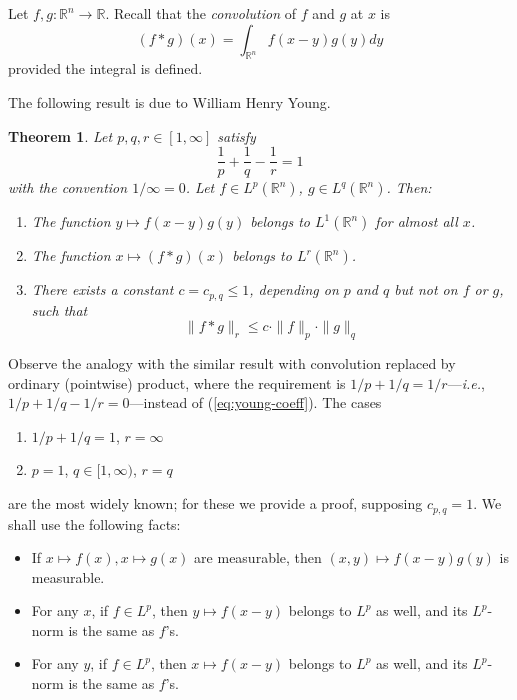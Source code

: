 \documentclass[12pt]{article}
\begin{document}
\newcommand{\ie}{\textit{i.e.}}
\newcommand{\Rset}{\ensuremath{\mathbb{R}}}

\newtheorem{theorem*}{Theorem}

Let $f,g:\Rset^n\to\Rset$.
Recall that the \emph{convolution} of $f$ and $g$ at $x$ is
\begin{displaymath}
(f\ast g)(x)=\int_{\Rset^n}f(x-y)g(y)dy
\end{displaymath}
provided the integral is defined.

The following result is due to William Henry Young.
\begin{theorem*}
Let $p,q,r\in[1,\infty]$ satisfy
\begin{equation} \label{eq:young-coeff}
\frac{1}{p}+\frac{1}{q}-\frac{1}{r}=1
\end{equation}
with the convention $1/\infty=0$.
Let $f\in L^p(\Rset^n)$, $g\in L^q(\Rset^n)$.
Then:
\begin{enumerate}
\item \label{it:L1}
The function $y\mapsto f(x-y)g(y)$
belongs to $L^1(\Rset^n)$ for almost all $x$.
\item \label{it:Lr}
The function $x\mapsto(f\ast g)(x)$
belongs to $L^r(\Rset^n)$.
\item \label{it:cpq}
There exists a constant $c=c_{p,q}\leq 1$,
depending on $p$ and $q$ but not on $f$ or $g$, such that
\begin{displaymath}
\|{f\ast g}\|_r
\leq c\cdot\|f\|_p\cdot\|g\|_q
\end{displaymath}
\end{enumerate}
\end{theorem*}
Observe the analogy with the similar result
with convolution replaced by ordinary (pointwise) product,
where the requirement is $1/p+1/q=1/r$---\ie,
$1/p+1/q-1/r=0$---instead of (\ref{eq:young-coeff}).
The cases
\begin{enumerate}
\item \label{item:p-q-infty}
$1/p+1/q=1$, $r=\infty$
\item \label{item:1-q-q}
$p=1$, $q \in [1,\infty)$, $r=q$
\end{enumerate}
are the most widely known;
for these we provide a proof, supposing $c_{p,q}=1$.
We shall use the following facts:
\begin{itemize}
\item
If $x\mapsto f(x),x\mapsto g(x)$ are measurable,
then $(x,y)\mapsto f(x-y)g(y)$ is measurable.
\item
For any $x$, if $f\in L^p$,
then $y\mapsto f(x-y)$ belongs to $L^p$ as well,
and its $L^p$-norm is the same as $f$'s.
\item
For any $y$, if $f\in L^p$,
then $x\mapsto f(x-y)$ belongs to $L^p$ as well,
and its $L^p$-norm is the same as $f$'s.
\end{itemize}
\end{document}
